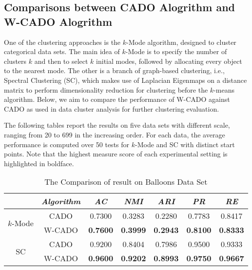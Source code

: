 \documentclass[review]{elsarticle}
\begin{document}
\subsection{Comparisons between CADO Alogrithm and W-CADO Alogrithm}
One of the clustering approaches is the $k$-Mode algorithm, designed to cluster categorical data sets. The main idea of $k$-Mode is to specify the number of clusters $k$ and then to select $k$ initial modes, followed by allocating every object to the nearest mode. The other is a branch of graph-based clustering, i.e., Spectral Clustering (SC), which makes use of Laplacian Eigenmaps on a distance matrix to perform dimensionality reduction for clustering before the $k$-means algorithm. Below, we aim to compare the performance of W-CADO against CADO as used in data cluster analysis for further clustering evaluation.

The following tables report the results on five data sets with different scale, ranging from 20 to 699 in the increasing order. For each data, the average performance is computed over 50 tests for $k$-Mode and SC with distinct start points. Note that the highest measure score of each experimental setting is highlighted in boldface.

\begin{table}[!h]\tabcolsep=0.065in
\centering
\caption{The Comparison of result on Balloons Data Set}
\small
\label{tab:The Clustering Results Comparison on Balloons Data Set}
\begin{tabular}{ccccccc}
\hline
\emph{}&\emph{Algorithm}&\emph{AC}&\emph{NMI}&\emph{ARI}&\emph{PR}&\emph{RE} \\
\hline
\multirow{2}{*}{$k$-Mode} & CADO & 0.7300 & 0.3283 & 0.2280 & 0.7783 & 0.8417\\
    & W-CADO & \textbf{0.7600} & \textbf{0.3999} & \textbf{0.2943} & \textbf{0.8100} & \textbf{0.8333}\\
    \hline
\multirow{2}{*}{SC} & CADO & 0.9200 & 0.8404 & 0.7986 & 0.9500 & 0.9333\\
    & W-CADO & \textbf{0.9600} & \textbf{0.9202} & \textbf{0.8993} & \textbf{0.9750} & \textbf{0.9667}\\
\hline
\end{tabular}
\end{table}
\end{document}

